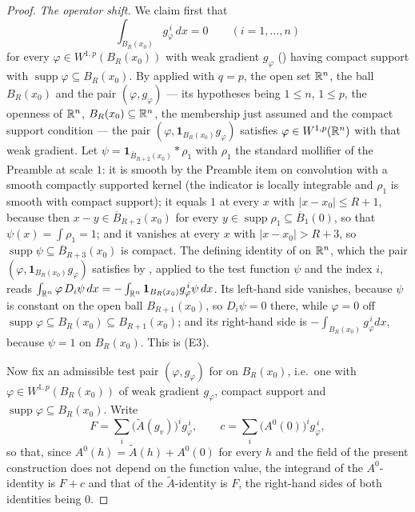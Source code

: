 \begin{proof}
\emph{The operator shift.}  We claim first that
\[
\int_{B_R(x_0)}g_\varphi^{\,i}\,dx=0\qquad(i=1,\dots,n)
\tag{E3}
\]
for every $\varphi\in W^{1,p}(B_R(x_0))$ with weak gradient $g_\varphi$
() having compact support with
$\operatorname{supp}\varphi\subseteq B_R(x_0)$.  By
 applied with $q=p$, the open set $\mathbb{R}^n$, the
ball $B_R(x_0)$ and the pair $(\varphi,g_\varphi)$ --- its hypotheses being
$1\le n$, $1\le p$, the openness of $\mathbb{R}^n$, $B_R(x_0)\subseteq\mathbb{R}^n$, the
membership just assumed and the compact support condition --- the pair
$(\varphi,\mathbf1_{B_R(x_0)}g_\varphi)$ satisfies $\varphi\in W^{1,p}(\mathbb{R}^n)$
with that weak gradient.  Let $\psi=\mathbf1_{\overline B_{R+2}(x_0)}*\rho_1$
with $\rho_1$ the standard mollifier of the Preamble at scale $1$: it is smooth
by the Preamble item on convolution with a smooth compactly supported kernel
(the indicator is locally integrable and $\rho_1$ is smooth with compact
support); it equals $1$ at every $x$ with $|x-x_0|\le R+1$, because then
$x-y\in\overline B_{R+2}(x_0)$ for every $y\in\operatorname{supp}\rho_1
\subseteq\overline B_1(0)$, so that $\psi(x)=\int\rho_1=1$; and it vanishes at
every $x$ with $|x-x_0|>R+3$, so $\operatorname{supp}\psi\subseteq
\overline B_{R+3}(x_0)$ is compact.  The defining identity of
 on $\mathbb{R}^n$, which the pair
$(\varphi,\mathbf1_{B_R(x_0)}g_\varphi)$ satisfies by ,
applied to the test function $\psi$ and the index $i$, reads
$\int_{\mathbb{R}^n}\varphi\,D_i\psi\,dx=-\int_{\mathbb{R}^n}\mathbf1_{B_R(x_0)}
g_\varphi^{\,i}\psi\,dx$.  Its left-hand side vanishes, because $\psi$ is
constant on the open ball $B_{R+1}(x_0)$, so $D_i\psi=0$ there, while
$\varphi=0$ off $\operatorname{supp}\varphi\subseteq B_R(x_0)\subseteq
B_{R+1}(x_0)$; and its right-hand side is $-\int_{B_R(x_0)}g_\varphi^{\,i}dx$,
because $\psi=1$ on $B_R(x_0)$.  This is (E3).

Now fix an admissible test pair $(\varphi,g_\varphi)$ for
 on $B_R(x_0)$, i.e.\ one with
$\varphi\in W^{1,p}(B_R(x_0))$ of weak gradient $g_\varphi$, compact support and
$\operatorname{supp}\varphi\subseteq B_R(x_0)$.  Write
\[
F=\sum_i\bigl(\widetilde A(g_v)\bigr)^ig_\varphi^{\,i},
\qquad
c=\sum_i\bigl(A^0(0)\bigr)^ig_\varphi^{\,i},
\]
so that, since $A^0(h)=\widetilde A(h)+A^0(0)$ for every $h$ and the field of
the present construction does not depend on the function value, the integrand
of the $A^0$-identity is $F+c$ and that of the $\widetilde A$-identity is $F$,
the right-hand sides of both identities being $0$.


\end{proof}
